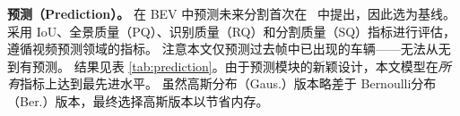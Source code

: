 \documentclass[runningheads]{llncs}
\begin{document}




\noindent\textbf{预测（Prediction）。} 在 BEV 中预测未来分割首次在~\cite{hu2021fiery} 中提出，因此选为基线。
%
采用 IoU、全景质量（PQ）、识别质量（RQ）和分割质量（SQ）指标进行评估，遵循视频预测领域的指标\cite{kim2020video}。
%
注意本文仅预测过去帧中已出现的车辆——无法从无到有预测。
%
结果见表 \ref{tab:prediction}。由于预测模块的新颖设计，本文模型在\textit{所有}指标上达到最先进水平。
%
虽然高斯分布（Gaus.）版本略差于 Bernoulli分布（Ber.）版本，最终选择高斯版本以节省内存。
\end{document}
